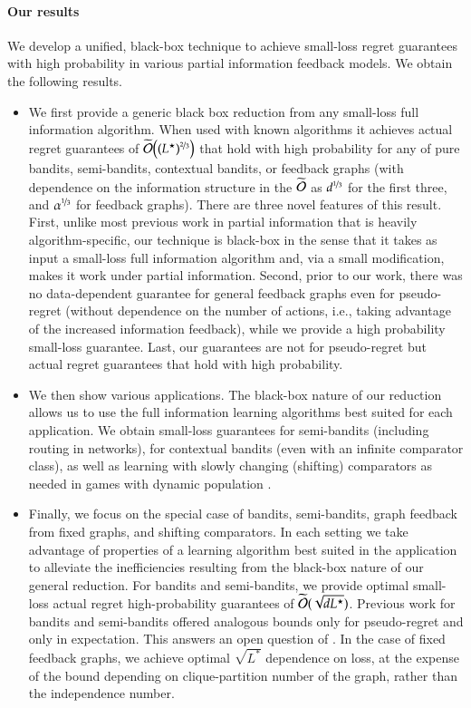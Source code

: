 \paragraph{Our results} We develop a unified, black-box technique to achieve small-loss regret guarantees with high probability in various partial information feedback models. We obtain the following results.
\begin{itemize}
\item We first provide a generic black box reduction from any small-loss full information algorithm. When used with known algorithms it achieves actual regret guarantees of 
$\widetilde{\bigO}\prn*{(L^{\star})^{\nicefrac{2}{3}}}$ 
that hold with high probability for any of pure bandits, semi-bandits, contextual bandits, or feedback graphs (with dependence on the information structure in the $\widetilde{\mathcal{O}}$ as $d^{\nicefrac{1}{3}}$ for the first three, and $\alpha^{\nicefrac{1}{3}}$ for feedback graphs).
    There are three novel features of
    this result. First, unlike most previous work in partial information that is heavily algorithm-specific, our technique is 
    black-box in the sense that it takes as input a small-loss full information algorithm and, via a small modification, makes it work under partial information. Second, prior to our work, there was no data-dependent guarantee 
    for general feedback graphs even for pseudo-regret (without dependence on the number of actions, i.e., taking advantage of the increased information feedback),  while we provide a high probability small-loss guarantee. 
    Last, our guarantees are not for pseudo-regret but actual regret guarantees that hold with high probability. 
\item We then show various applications.  The black-box nature of our reduction allows us to use the full information learning algorithms best suited for each application. We obtain small-loss guarantees for semi-bandits \citep{KalaiVempala} (including routing in networks), for contextual bandits \citep{Langford2007} (even with an infinite comparator class), as well as learning with slowly changing (shifting) comparators \citep{Herbster1998} as needed in games with dynamic population \citep{LykourisST16,FosterLLST16}.

\item Finally, we focus on the special case of bandits, semi-bandits, graph feedback from fixed graphs, and shifting  comparators. In each setting we take advantage of properties of a learning algorithm best suited in the application to alleviate the inefficiencies resulting from the black-box nature of our general reduction.
For  bandits and semi-bandits, we provide optimal small-loss actual regret high-probability guarantees of $\widetilde{\mathcal{O}}(\sqrt{dL^{\star}})$. Previous work for bandits and semi-bandits offered analogous bounds only for pseudo-regret and only in expectation.
This answers an open question of \cite{Neu15_semibandits,Neu2015_implicit}. In the case of 
fixed feedback graphs, we achieve optimal $\sqrt{L^*}$ dependence on loss, at the expense of the bound depending on clique-partition number of the graph, rather than the independence number. 
\end{itemize}

